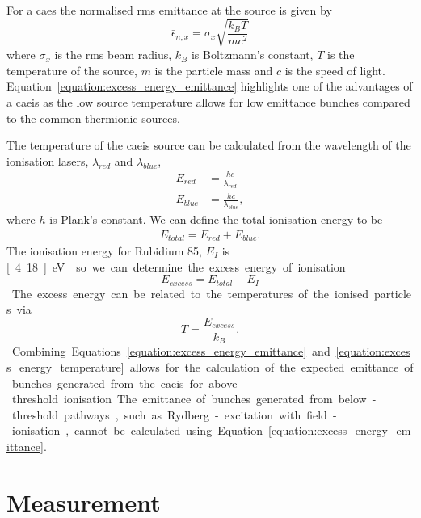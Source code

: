 For a \gls{caes} the normalised \gls{rms} emittance at the source is given by~\cite{mcculloch_high-coherence_2013}
\begin{equation}\label{equation:excess_energy_emittance}
\bar{\epsilon}_{n,x} = \sigma_x \sqrt{\frac{k_B T}{m c^2}}
\end{equation}
where $\sigma_x$ is the \gls{rms} beam radius, $k_B$ is Boltzmann's constant, $T$ is the temperature of the source, $m$ is the particle mass and $c$ is the speed of light.
Equation~\ref{equation:excess_energy_emittance} highlights one of the advantages of a \gls{caeis} as the low source temperature allows for low emittance bunches compared to the common thermionic sources.

The temperature of the \gls{caeis} source can be calculated from the wavelength of the ionisation lasers, $\lambda_{red}$ and $\lambda_{blue}$,
\begin{align}
 E_{red} &= \frac{hc}{\lambda_{red}} \\
 E_{blue}&= \frac{hc}{\lambda_{blue}},
\end{align}
where $h$ is Plank's constant.
We can define the total ionisation energy to be
\begin{align}
E_{total} = E_{red} + E_{blue}.
\end{align}
The ionisation energy for Rubidium 85, $E_I$ is \unit[4.18]{eV}~\cite{steck_rubidium_2008} so we can determine the excess energy of ionisation
\begin{equation}
E_{excess} = E_{total} - E_I
\end{equation}

The excess energy can be related to the temperatures of the ionised particles via
\begin{equation}\label{equation:excess_energy_temperature}
T = \frac{E_{excess}}{k_B}.
\end{equation}
Combining Equations \ref{equation:excess_energy_emittance} and \ref{equation:excess_energy_temperature} allows for the calculation of the expected emittance of bunches generated from the \gls{caeis} for above-threshold ionisation.
The emittance of bunches generated from below-threshold pathways, such as Rydberg-excitation with field-ionisation, cannot be calculated using Equation~\ref{equation:excess_energy_emittance}.

\section{Measurement}

